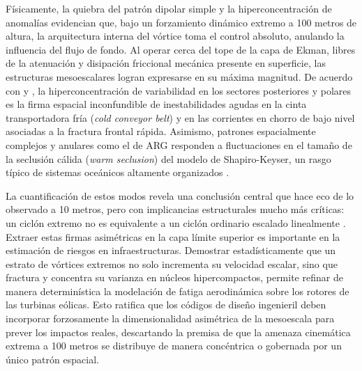Físicamente, la quiebra del patrón dipolar simple y la hiperconcentración de anomalías evidencian que, bajo un forzamiento dinámico extremo a 100 metros de altura, la arquitectura interna del vórtice toma el control absoluto, anulando la influencia del flujo de fondo. Al operar cerca del tope de la capa de Ekman, libres de la atenuación y disipación friccional mecánica presente en superficie, las estructuras mesoescalares logran expresarse en su máxima magnitud. De acuerdo con \citet{clark2005sting} y \citet{han2025system}, la hiperconcentración de variabilidad en los sectores posteriores y polares es la firma espacial inconfundible de inestabilidades agudas en la cinta transportadora fría (\textit{cold conveyor belt}) y en las corrientes en chorro de bajo nivel asociadas a la fractura frontal rápida. Asimismo, patrones espacialmente complejos y anulares como el de ARG responden a fluctuaciones en el tamaño de la seclusión cálida (\textit{warm seclusion}) del modelo de Shapiro-Keyser, un rasgo típico de sistemas oceánicos altamente organizados \citep{schultz2021antecedents, reboita2022from}.

La cuantificación de estos modos revela una conclusión central que hace eco de lo observado a 10 metros, pero con implicancias estructurales mucho más críticas: un ciclón extremo no es equivalente a un ciclón ordinario escalado linealmente \citep{corner2025classification, eisenstein2023identification}. Extraer estas firmas asimétricas en la capa límite superior es importante en la estimación de riesgos en infraestructuras. Demostrar estadísticamente que un estrato de vórtices extremos no solo incrementa su velocidad escalar, sino que fractura y concentra su varianza en núcleos hipercompactos, permite refinar de manera determinística la modelación de fatiga aerodinámica sobre los rotores de las turbinas eólicas. Esto ratifica que los códigos de diseño ingenieril deben incorporar forzosamente la dimensionalidad asimétrica de la mesoescala para prever los impactos reales, descartando la premisa de que la amenaza cinemática extrema a 100 metros se distribuye de manera concéntrica o gobernada por un único patrón espacial.
